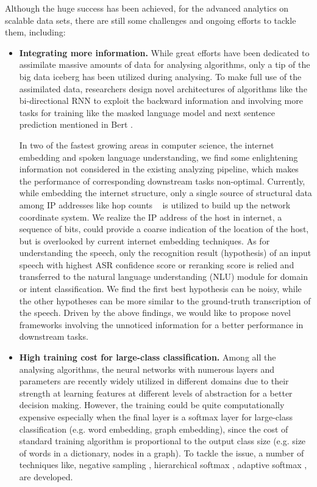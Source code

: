 \documentclass [PhD] {uclathes}
\begin{document}
Although the huge success has been achieved, for the advanced analytics on scalable data sets, there are still some challenges and ongoing efforts to tackle them, including:
\begin{itemize}
	
	\item \textbf{Integrating more information.} While great efforts have been dedicated to assimilate massive amounts of data for analysing algorithms, only a tip of the big data iceberg has been utilized during analysing. 
	To make full use of the assimilated data, researchers design novel architectures of algorithms like the bi-directional RNN \citep{graves2013speech} to exploit the backward information and involving more tasks for training like the masked language model and next sentence prediction mentioned in Bert \citep{devlin2018bert}.
	
	In two of the fastest growing areas in  computer science, the internet embedding and spoken language understanding, we find some enlightening information not considered in the existing analyzing pipeline, which makes  the performance of corresponding downstream tasks non-optimal. Currently, while embedding the internet structure,  only a single source of structural data among IP addresses like hop counts ~\citep{barford-sigcomm,barford-infocom} is utilized to build up the network coordinate system. We realize the IP address of the host in internet, a sequence of bits, could provide a coarse indication of the location of the host, but is overlooked by current internet embedding techniques. As for understanding the speech, only the recognition result (hypothesis) of an input speech with highest ASR confidence score \citep{tur2011spoken} or reranking score \citep{peng2013search, morbini2012reranking} is relied and transferred to the natural language understanding (NLU) module for domain or intent classification.  We find the first best hypothesis can be noisy, while the other hypotheses can be more similar to the  ground-truth transcription of the speech. Driven by the above findings, we would like to propose novel frameworks involving the unnoticed information for a better performance in downstream tasks. 
	
	\item \textbf{High training cost for large-class classification.} Among all the analysing algorithms, the neural networks with numerous layers and parameters are recently widely utilized  in different domains due to their strength at learning features at different levels of abstraction for a better decision making. However, the training could be quite computationally expensive especially when the final layer is a softmax layer for large-class classification (e.g. word embedding, graph embedding), since the cost of standard training algorithm  is proportional to the output class size (e.g. size of words in a dictionary, nodes in a graph).  To tackle the issue, a number of techniques like, negative sampling \citep{mikolov2013efficient}, hierarchical  softmax \citep{morin2005hierarchical}, adaptive softmax \citep{bengio2008adaptive,rawat2019sampled} , are developed.
	

\end{itemize}
\end{document}
